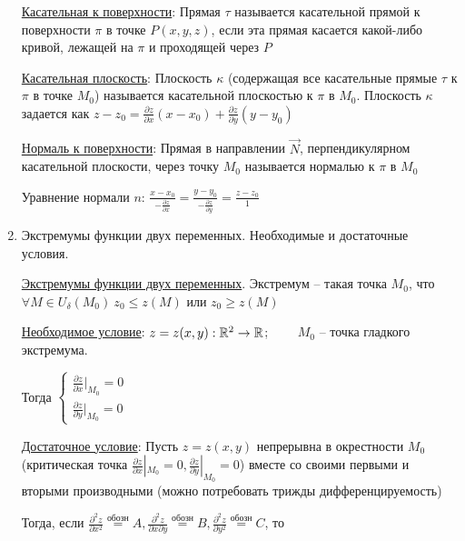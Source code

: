 \documentclass[12pt]{article}
\begin{document}
\begin{enumerate}
        \hyperlink{tangenttosurface}{Касательная к поверхности}: Прямая $\tau$ называется касательной прямой к поверхности $\pi$ в точке $P(x, y, z)$,
        если эта прямая касается какой-либо кривой, лежащей на $\pi$ и проходящей через $P$

        \hyperlink{tangentplanetosurface}{Касательная плоскость}: Плоскость $\kappa$ (содержащая все касательные прямые $\tau$ к $\pi$ в точке $M_0$) называется касательной плоскостью к $\pi$ в $M_0$. Плоскость $\kappa$ задается как $z - z_0 = \frac{\partial z}{\partial x}(x - x_0) + \frac{\partial z}{\partial y} (y - y_0)$

        \hyperlink{normaltosurface}{Нормаль к поверхности}: Прямая в направлении $\overrightarrow{N}$, перпендикулярном касательной плоскости, через точку $M_0$ называется нормалью к $\pi$ в $M_0$

        Уравнение нормали $n$: $\frac{x - x_0}{-\frac{\partial z}{\partial x}} = \frac{y - y_0}{-\frac{\partial z}{\partial y}} = \frac{z - z_0}{1}$


        \item Экстремумы функции двух переменных. Необходимые и достаточные условия.

        \hyperlink{extremumsoffunctions}{Экстремумы функции двух переменных}.
        Экстремум -- такая точка $M_0$, что $\forall M \in U_\delta(M_0) \ z_0 \leq z(M)$ или $z_0 \geq z(M)$

        \hyperlink{extremumnecessarycondition}{Необходимое условие}: $z = z(x, y) : \mathbb{R}^2 \rightarrow \mathbb{R}$; $\quad\quad M_0$ -- точка гладкого экстремума.

        Тогда $\begin{cases}\frac{\partial z}{\partial x} |_{M_0} = 0 \\ \frac{\partial z}{\partial y} |_{M_0} = 0\end{cases}$

        \hyperlink{extremumsufficientcondition}{Достаточное условие}: Пусть $z = z(x, y)$ непрерывна в окрестности $M_0$ (критическая точка $\frac{\partial z}{\partial x} |_{M_0} = 0, \frac{\partial z}{\partial y} |_{M_0} = 0$)
        вместе со своими первыми и вторыми производными (можно потребовать трижды дифференцируемость)

        Тогда, если $\frac{\partial^2 z}{\partial x^2} \stackrel{\text{обозн}}{=} A, \frac{\partial^2 z}{\partial x \partial y} \stackrel{\text{обозн}}{=} B, \frac{\partial^2 z}{\partial y^2} \stackrel{\text{обозн}}{=} C$, то


\end{enumerate}
\end{document}
